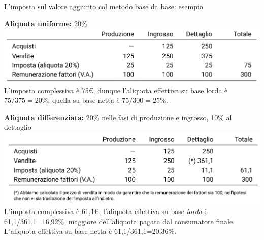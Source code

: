 \documentclass[aspectratio=64,11pt]{beamer}
\begin{document}
\begin{frame}{L'imposta sul valore aggiunto col metodo base da base: esempio}
  \vspace*{-3.5mm}\footnotesize
  \begin{block}{}
    \textbf{Aliquota uniforme:} 20\%\\
    \includegraphics[width=.8\textwidth]{./figure/esempio-base-da-base-aliquota-uniforme.png}\\
    L'imposta complessiva è 75€, dunque l'aliquota effettiva su base lorda
    è $75/375=20\%$, quella su base netta è $75/300=25\%$.
  \end{block}
  \begin{block}{}
    \textbf{Aliquota differenziata:} 20\% nelle fasi di produzione e ingrosso, 10\% al
      dettaglio\\
      \includegraphics[width=.8\textwidth]{./figure/esempio-base-da-base-aliquota-differenziata.png}\\
    L'imposta complessiva è 61,1€, l'aliquota effettiva su base \emph{lorda} è
    61,1/361,1=16,92\%, maggiore dell'aliquota pagata dal consumatore
    finale. L'aliquota effettiva su base netta è 61,1/361,1=20,36\%.
  \end{block}
\end{frame}
\end{document}
